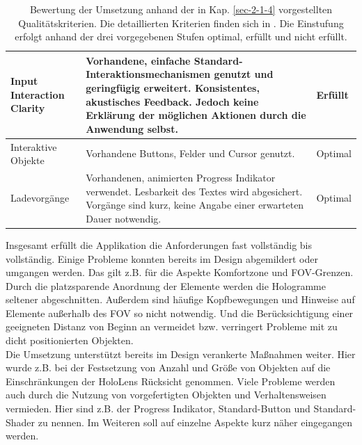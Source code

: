 \begin{landscape}
\begin{table}
\begin{tabular}{m{2.3cm}|m{15.5cm}|m{2cm}}
			\hline
			Input Interaction Clarity & Vorhandene, einfache Standard-Interaktionsmechanismen genutzt und geringfügig erweitert. Konsistentes, akustisches Feedback. Jedoch keine Erklärung der möglichen Aktionen durch die Anwendung selbst. & Erfüllt\\
			\hline
			Interaktive Objekte & Vorhandene Buttons, Felder und Cursor genutzt. & Optimal\\
			\hline
			Ladevorgänge & Vorhandenen, animierten Progress Indikator verwendet. Lesbarkeit des Textes wird abgesichert. Vorgänge sind kurz, keine Angabe einer erwarteten Dauer notwendig. & Optimal\\
		\end{tabular}\caption{\label{tab:tech_results} Bewertung der Umsetzung anhand der in Kap. \ref{sec-2-1-4} vorgestellten Qualitätskriterien. Die detaillierten Kriterien finden sich in \cite{MRDocQuality}. Die Einstufung erfolgt anhand der drei vorgegebenen Stufen optimal, erfüllt und nicht erfüllt.}
	\end{table}
	\egroup
\end{landscape}

Insgesamt erfüllt die Applikation die Anforderungen fast vollständig bis vollständig. Einige Probleme konnten bereits im Design abgemildert oder umgangen werden. Das gilt z.B. für die Aspekte Komfortzone und FOV-Grenzen. Durch die platzsparende Anordnung der Elemente werden die Hologramme seltener abgeschnitten. Außerdem sind häufige Kopfbewegungen und Hinweise auf Elemente außerhalb des FOV so nicht notwendig. Und die Berücksichtigung einer geeigneten Distanz von Beginn an vermeidet bzw. verringert Probleme mit zu dicht positionierten Objekten.\\

Die Umsetzung unterstützt bereits im Design verankerte Maßnahmen weiter. Hier wurde z.B. bei der Festsetzung von Anzahl und Größe von Objekten auf die Einschränkungen der HoloLens Rücksicht genommen. Viele Probleme werden auch durch die Nutzung von vorgefertigten Objekten und Verhaltensweisen vermieden. Hier sind z.B. der Progress Indikator, Standard-Button und Standard-Shader zu nennen. Im Weiteren soll auf einzelne Aspekte kurz näher eingegangen werden.\\

